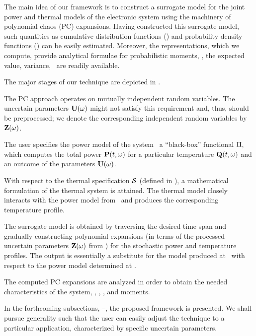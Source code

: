The main idea of our framework is to construct a surrogate model for the joint power and thermal models of the electronic system using the machinery of polynomial chaos (PC) expansions.
Having constructed this surrogate model, such quantities as cumulative distribution functions (\cdfs) and probability density functions (\pdfs) can be easily estimated.
Moreover, the representations, which we compute, provide analytical formulae for probabilistic moments, \ie, the expected value, variance, \etc\ are readily available.

The major stages of our technique are depicted in .

The PC approach operates on mutually independent random variables. The uncertain parameters $\mathbf{U}(\omega)$ might not satisfy this requirement and, thus, should be preprocessed; we denote the corresponding independent random variables by $\mathbf{Z}(\omega)$.

The user specifies the power model of the system \via\ a ``black-box'' functional $\oPower$, which computes the total power $\mathbf{P}(t, \omega)$ for a particular temperature $\mathbf{Q}(t, \omega)$ and an outcome of the parameters $\mathbf{U}(\omega)$.

With respect to the thermal specification $\mathcal{S}$ (defined in ), a mathematical formulation of the thermal system is attained.
The thermal model closely interacts with the power model from \ and produces the corresponding temperature profile.

The surrogate model is obtained by traversing the desired time span and gradually constructing polynomial expansions (in terms of the processed uncertain parameters $\mathbf{Z}(\omega)$ from ) for the stochastic power and temperature profiles.
The output is essentially a substitute for the model produced at \ with respect to the power model determined at .

The computed PC expansions are analyzed in order to obtain the needed characteristics of the system, \eg, \cdfs, \pdfs, and moments.

In the forthcoming subsections, --, the proposed framework is presented.
We shall pursue generality such that the user can easily adjust the technique to a particular application, characterized by specific uncertain parameters.

